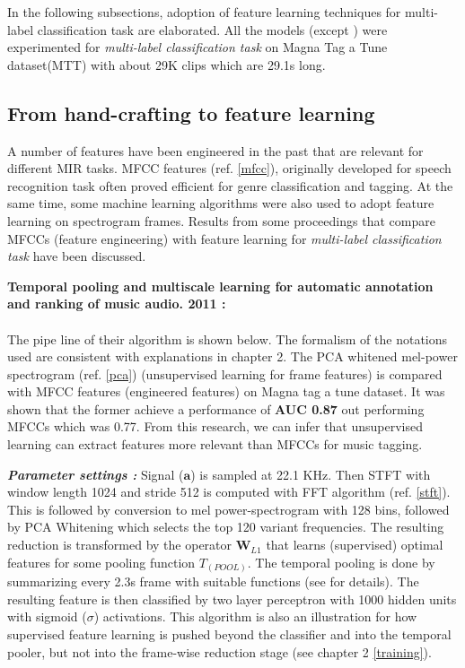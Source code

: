 \noindent In the following subsections, adoption of feature learning techniques for multi-label classification task are elaborated. All the models (except \cite{MusicMotive}) were experimented for \textit{multi-label classification task} on Magna Tag a Tune dataset(MTT)\cite{MTT} with about 29K clips which are 29.1s long.

\subsection{From hand-crafting to feature learning}
\label{featurelearning}
A number of features have been engineered in the past that are relevant for different MIR tasks. MFCC features (ref. \ref{mfcc}), originally developed for speech recognition task often proved efficient for genre classification and tagging. At the same time, some machine learning algorithms were also used to adopt feature learning on spectrogram frames. Results from some proceedings that compare MFCCs (feature engineering) with feature learning for \textit{multi-label classification task} have been discussed.
\bigskip

\noindent \textbf{Temporal pooling and multiscale learning for automatic annotation and ranking of music audio. 2011 \cite{featurelearn1}:}\\
\\
\noindent The pipe line of their algorithm is shown below. The formalism of the notations used are consistent with explanations in chapter 2. The PCA whitened mel-power spectrogram (ref. \ref{pca}) (unsupervised learning for frame features) is compared with MFCC features (engineered features) on Magna tag a tune dataset. It was shown that the former achieve a performance of \textbf{AUC 0.87} out performing MFCCs which was 0.77. From this research, we can infer that unsupervised learning can extract features more relevant than MFCCs for music tagging.  
\bigskip

\noindent \textbf{\textit{Parameter settings :}} Signal ($\textbf{a}$) is sampled at 22.1 KHz. Then STFT with window length 1024 and stride 512 is computed with FFT algorithm (ref. \ref{stft}). This is followed by conversion to mel power-spectrogram with 128 bins, followed by PCA Whitening which selects the top 120 variant frequencies. The resulting reduction is transformed by the operator $\textbf{W}_{L1}$ that learns (supervised) optimal features for some pooling function $T_{(POOL)}$. The temporal pooling is done by summarizing every 2.3s frame with suitable functions (see \cite{featurelearn1} for details). The resulting feature is then classified by two layer perceptron with 1000 hidden units with sigmoid ($\sigma$) activations. This algorithm is also an illustration for how supervised feature learning is pushed beyond the classifier and into the temporal pooler, but not into the frame-wise reduction stage (see chapter 2 \ref{training}).

